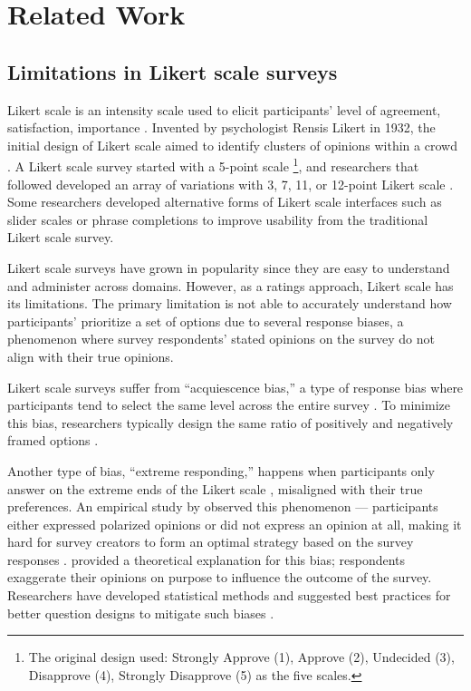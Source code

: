 \section{Related Work} \label{related_works}

\subsection{Limitations in Likert scale surveys}
Likert scale is an intensity scale used to elicit participants' level of agreement, satisfaction, importance \cite{likert1932technique}. Invented by psychologist Rensis Likert in 1932, the initial design of Likert scale aimed to identify clusters of opinions within a crowd \cite{joshi2015likert}. A Likert scale survey started with a 5-point scale \footnote{The original design used: Strongly Approve (1), Approve (2), Undecided (3), Disapprove (4), Strongly Disapprove (5) as the five scales.}, and researchers that followed developed an array of variations with 3, 7, 11, or 12-point Likert scale \cite{garland2008computer,finstad2010}. Some researchers developed alternative forms of Likert scale interfaces such as slider scales \cite{roster2015exploring} or phrase completions \cite{hodge2003phrase} to improve usability from the traditional Likert scale survey. 

Likert scale surveys have grown in popularity since they are easy to understand and administer across domains. However, as a ratings approach, Likert scale has its limitations. The primary limitation is not able to accurately understand how participants' prioritize a set of options due to several response biases, a phenomenon where survey respondents' stated opinions on the survey do not align with their true opinions. 

Likert scale surveys suffer from ``acquiescence bias,'' a type of response bias where participants tend to select the same level across the entire survey \cite{alwin1985measurement, moors2016two}. To minimize this bias, researchers typically design the same ratio of positively and negatively framed options \cite{kuru2016improving}. 

Another type of bias, ``extreme responding,'' happens when participants only answer on the extreme ends of the Likert scale \cite{batchelor2016extreme, furnham1986response, meisenberg2008acquiescent}, misaligned with their true preferences. An empirical study by \textcite{quarfoot2017quadratic} observed this phenomenon --- participants either expressed polarized opinions or did not express an opinion at all, making it hard for survey creators to form an optimal strategy based on the survey responses \cite{posner2018radical}. \textcite{cavaille2018towards} provided a theoretical explanation for this bias; respondents exaggerate their opinions on purpose to influence the outcome of the survey. Researchers have developed statistical methods and suggested best practices for better question designs to mitigate such biases \cite{glaser2008response}.

